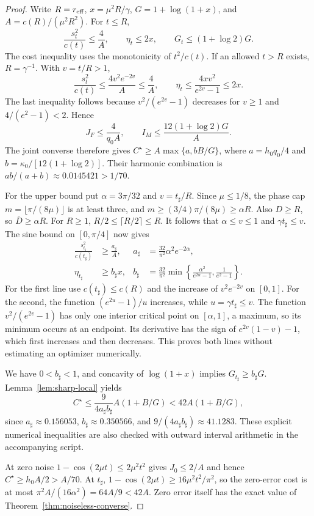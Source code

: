 \begin{proof}
Write $R=r_{\mathrm{eff}}$, $x=\mu^2R/\gamma$, $G=1+\log(1+x)$, and
$A=c(R)/(\mu^2R^2)$. For $t\leq R$,
\[
 \frac{s_t^2}{c(t)}\leq\frac4A,\qquad
 \eta_t\leq2x,\qquad G_t\leq(1+\log2)G.
\]
The cost inequality uses the monotonicity of $t^2/c(t)$.
If an allowed $t>R$ exists, $R=\gamma^{-1}$. With $v=t/R>1$,
\[
 \frac{s_t^2}{c(t)}\leq\frac{4v^2e^{-2v}}A\leq\frac4A,
 \qquad
 \eta_t\leq\frac{4xv^2}{e^{2v}-1}\leq2x.
\]
The last inequality follows because $v^2/(e^{2v}-1)$ decreases for
$v\geq1$ and $4/(e^2-1)<2$. Hence
\[
 J_F\leq\frac4{q_0A},\qquad
 I_M\leq\frac{12(1+\log2)G}{A}.
\]
The joint converse therefore gives
$C^\star\geq A\max\{a,bB/G\}$, where
$a=h_0q_0/4$ and $b=\kappa_0/[12(1+\log2)]$.
Their harmonic combination is $ab/(a+b)\approx0.0145421>1/70$.

For the upper bound put $\alpha=3\pi/32$ and $v=t_\sharp/R$.
Since $\mu\leq1/8$, the phase cap
$m=\lfloor\pi/(8\mu)\rfloor$ is at least three, and
$m\geq(3/4)\pi/(8\mu)\geq\alpha R$.
Also $D\geq R$, so $\overline D\geq\alpha R$.
For $R\geq1$, $R/2\leq\lceil R/2\rceil\leq R$.
It follows that $\alpha\leq v\leq1$ and $\gamma t_\sharp\leq v$.
The sine bound on $[0,\pi/4]$ now gives
\begin{align}
 \frac{s_{t_\sharp}^2}{c(t_\sharp)}
 &\geq\frac{a_\sharp}{A},&
 a_\sharp&=\frac{32}{\pi^2}\alpha^2e^{-2\alpha},\label{eq:sharp-a}\\
 \eta_{t_\sharp}&\geq b_\sharp x,&
 b_\sharp&=\frac{32}{\pi^2}
 \min\left\{\frac{\alpha^2}{e^{2\alpha}-1},
                     \frac1{e^2-1}\right\}.\label{eq:sharp-b}
\end{align}
For the first line use $c(t_\sharp)\leq c(R)$ and the increase of
$v^2e^{-2v}$ on $[0,1]$. For the second, the function
$(e^{2u}-1)/u$ increases, while $u=\gamma t_\sharp\leq v$.
The function $v^2/(e^{2v}-1)$ has only one interior critical point
on $[\alpha,1]$, a maximum, so its minimum occurs at an endpoint.
Its derivative has the sign of $e^{2v}(1-v)-1$, which first increases
and then decreases. This proves both lines without estimating an
optimizer numerically.

We have $0<b_\sharp<1$, and concavity of $\log(1+x)$ implies
$G_{t_\sharp}\geq b_\sharp G$.
Lemma~\ref{lem:sharp-local} yields
\[
 C^\star\leq\frac{9}{4a_\sharp b_\sharp}
           A(1+B/G)<42A(1+B/G),
\]
since $a_\sharp\approx0.156053$, $b_\sharp\approx0.350566$, and
$9/(4a_\sharp b_\sharp)\approx41.1283$.
These explicit numerical inequalities are also checked with outward
interval arithmetic in the accompanying script.

At zero noise $1-\cos(2\mu t)\leq2\mu^2t^2$ gives
$J_0\leq2/A$ and hence $C^\star\geq h_0A/2>A/70$.
At $t_\sharp$, $1-\cos(2\mu t)\geq16\mu^2t^2/\pi^2$, so
the zero-error cost is at most $\pi^2A/(16\alpha^2)=64A/9<42A$.
Zero error itself has the exact value of Theorem~\ref{thm:noiseless-converse}.
\end{proof}

